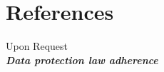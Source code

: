 \documentclass[11pt,a4paper,sans,english]{moderncv}        %
\begin{document}
\section{References}
	Upon Request\\
	\textbf{\textit{Data protection law adherence}}
\begin{comment}
\begin{center}
	\begin{tabular}{p{6cm}p{8cm}}
		\textbf{Name:} & Dr. Mundia S.M, Lecturer\\
		\textbf{Position:} & Project  Coordinator\\
		\textbf{Company:} & Dedan Kimathi University of Technology \\
		\textbf{Contact:} & +254 721 302 869\\
		\textbf{Email:} & simon.maina@dkut.ac.ke \\
		\\
		\textbf{Name:} & Dr. Omari Cyprian \\
		\textbf{Position:} & Chairman \\
		\textbf{Company:} & BSc Statistics and Actuarial Science, Dedan Kimathi University of Technology \\
		\textbf{Contact:} & +254 722 616 725 \\
		\textbf{Email:} & cyomari@dkut.ac.ke \\
		\\
		\textbf{Name:} & Julius Miheso \\
		\textbf{Position:} & Internal Auditor \\
		\textbf{Company:} & NSSF \\
		\textbf{Contact:} & +254 720 652 682 \\
		\textbf{Email:} & atsiaya80@gmail.com \\
		\\
		\textbf{Name:} & Gideon Ngome \\
		\textbf{Position:} & Risk Manager \\
		\textbf{Company:} & NSSF \\
		\textbf{Contact:} & +254 746 595 822 \\
		\textbf{Email:} & ngomegideon@yahoo.com \\
		

	\end{tabular}
\end{center}
	\end{comment}
\end{document}
